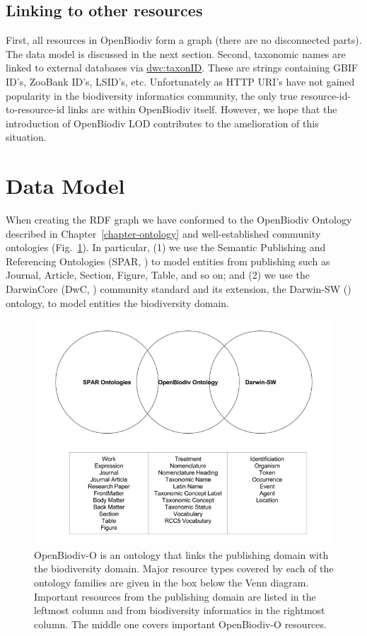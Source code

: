 \subsection{Linking to other resources}

First, all resources in OpenBiodiv form a graph (there are no disconnected parts). The data model is discussed in the next section. Second, taxonomic names are linked to external databases via \url{dwc:taxonID}. These are strings containing GBIF ID's, ZooBank ID's, LSID's, etc. Unfortunately as HTTP URI's have not gained popularity in the biodiversity informatics community, the only true resource-id-to-resource-id links are within OpenBiodiv itself. However, we hope that the introduction of OpenBiodiv LOD contributes to the amelioration of this situation.

\section{Data Model}

When creating the RDF graph we have conformed to the OpenBiodiv Ontology described in Chapter~\ref{chapter-ontology} and well-established community ontologies (Fig.~\ref{fig:community-ontologies}). In particular, (1) we use the Semantic Publishing and Referencing Ontologies (SPAR, \cite{peroni_semantic_2014}) to model entities from publishing such as Journal, Article, Section, Figure, Table, and so on; and (2) we use the DarwinCore (DwC, \cite{wieczorek_darwin_2012}) community standard and its extension, the Darwin-SW (\cite{baskauf_darwin-sw:_2016}) ontology, to model entities the biodiversity domain.

\begin{figure}
\centering
\includegraphics[width=\textwidth]{Figures/community-ontologies}
\decoRule
\caption[Overlap of OpenBiodiv-O with Community Ontologies]{OpenBiodiv-O is an ontology that links the publishing domain with the biodiversity domain. Major resource types covered by each of the ontology families are given in the box below the Venn diagram. Important resources from the publishing domain are listed in the leftmost column and from biodiversity informatics in the rightmost column. The middle one covers important OpenBiodiv-O resources.}
\label{fig:community-ontologies}
\end{figure}

